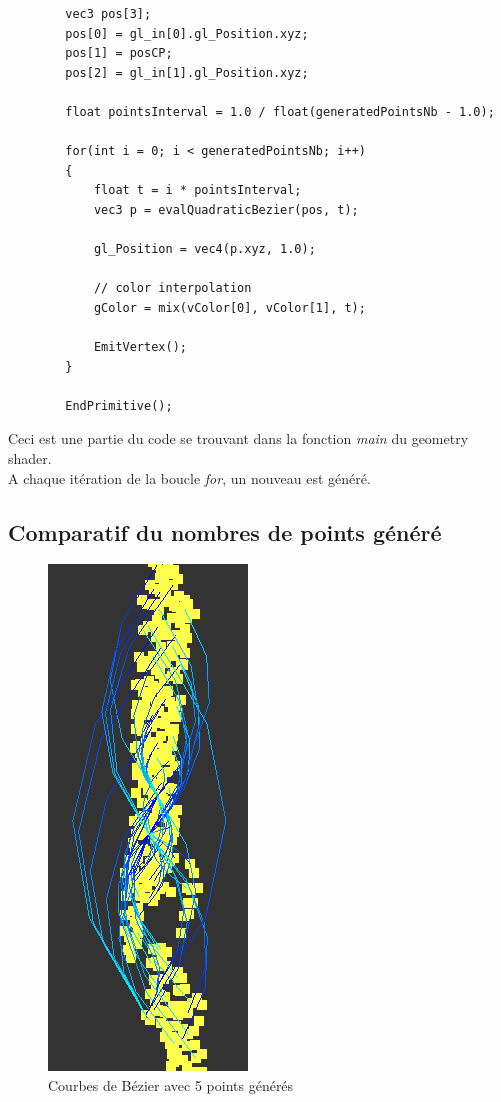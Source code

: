 \documentclass[12pt]{article}
\begin{document}
		\begin{lstlisting}
		vec3 pos[3];
	    pos[0] = gl_in[0].gl_Position.xyz;
	    pos[1] = posCP;
	    pos[2] = gl_in[1].gl_Position.xyz;
	
	    float pointsInterval = 1.0 / float(generatedPointsNb - 1.0);
	
	    for(int i = 0; i < generatedPointsNb; i++)
	    {
	        float t = i * pointsInterval;
	        vec3 p = evalQuadraticBezier(pos, t);
	
	        gl_Position = vec4(p.xyz, 1.0);
	
	        // color interpolation
	        gColor = mix(vColor[0], vColor[1], t);
	
	        EmitVertex();
	    }
	
	    EndPrimitive();
		\end{lstlisting}
		
		Ceci est une partie du code se trouvant dans la fonction \textit{main} du geometry shader. \\
		A chaque itération de la boucle \textit{for}, un nouveau est généré.\\
		
		\clearpage
	
		\subsection{Comparatif du nombres de points généré}	 \label{comparatif_courbes_bezier}		
		\begin{figure}[!h]
		\begin{center}
		\includegraphics[scale=.60]{5_generated_points.png}
		\caption{Courbes de Bézier avec 5 points générés}
		\end{center}
		\end{figure}
		
\end{document}
